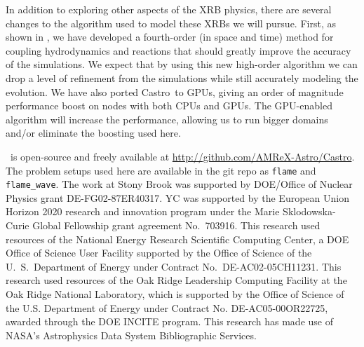 \documentclass[preprint,times,tighten]{aastex63}
\newcommand{\castro}{{\sf Castro}}
\newcommand{\MarginPar}[1]{
    \marginpar{\vskip-\baselineskip%
               \raggedright%
               \tiny\sffamily%
               {\color{red}\hrule%
               \smallskip%
               #1\par%
               \smallskip%
               \hrule}}%
}
\begin{document}


In addition to exploring other aspects of the XRB physics, there are several changes to the algorithm used to
model these XRBs we will pursue.  First, as shown in \citet{castro-sdc}, we have
developed a fourth-order (in space and time) method for coupling
hydrodynamics and reactions that should greatly improve the accuracy
of the simulations.  We expect that by using this new high-order
algorithm we can drop a level of refinement from the simulations while
still accurately modeling the evolution.  We have also ported
\castro\ to GPUs, giving an order of magnitude performance boost on
nodes with both CPUs and GPUs.  The GPU-enabled algorithm will
increase the performance, allowing us to run bigger domains and/or
eliminate the boosting used here. 



\acknowledgements \castro\ is open-source and freely available at
\url{http://github.com/AMReX-Astro/Castro}.  The problem setups used
here are available in the git repo as {\tt flame} and {\tt
  flame\_wave}.  The work at Stony Brook was supported by DOE/Office
of Nuclear Physics grant DE-FG02-87ER40317.  YC was supported by the
European Union Horizon 2020 research and innovation program under
the Marie Sklodowska-Curie Global Fellowship grant agreement No.\
703916.  This research used resources of the National Energy Research
Scientific Computing Center, a DOE Office of Science User Facility
supported by the Office of Science of the U.~S.\ Department of Energy
under Contract No.\ DE-AC02-05CH11231.  This research used resources
of the Oak Ridge Leadership Computing Facility at the Oak Ridge
National Laboratory, which is supported by the Office of Science of
the U.S. Department of Energy under Contract No. DE-AC05-00OR22725,
awarded through the DOE INCITE program.  This research has made use of
NASA's Astrophysics Data System Bibliographic Services.


\end{document}
